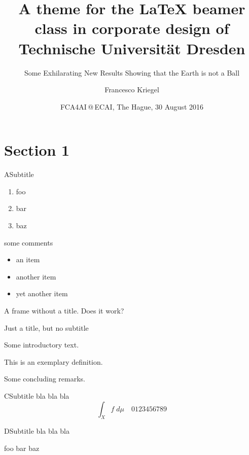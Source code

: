 \documentclass[aspectratio=1610]{beamer}
\title
  [TUD Beamer Theme]
  {A theme for the LaTeX beamer class in corporate design of Technische Universität Dresden}
\subtitle{Some Exhilarating New Results Showing that the Earth is not a Ball}
\author{Francesco Kriegel}
\institute[TU Dresden]{Technische Universität Dresden}
\date[FCA4AI\,@\,ECAI 2016]{FCA4AI\,@\,ECAI, The Hague, 30 August 2016}
\begin{document}
\maketitle

\section{Section 1}

\begin{frame}{A}{Subtitle}
  \begin{enumerate}
    \item
      foo
    \item
      bar
    \item
      baz
  \end{enumerate}
  some comments
  \begin{itemize}
    \item
      an item
    \item
      another item
    \item
      yet another item
  \end{itemize}
\end{frame}

\begin{frame}
  A frame without a title.  Does it work?
\end{frame}

\begin{frame}{Just a title, but no subtitle}
  
  Some introductory text.
  
  \pause
  
  \begin{definition}
    This is an exemplary definition.
  \end{definition}
  
  \pause
  
  Some concluding remarks.
  
\end{frame}

\begin{frame}{C}{Subtitle}
  bla bla bla
  \begin{equation*}
    \int_{X}f\;d\mu\quad0123456789
  \end{equation*}
\end{frame}

\begin{frame}{D}{Subtitle}
  bla bla bla
  
  
  \begin{definition}
    foo bar baz
  \end{definition}
\end{frame}
\end{document}

